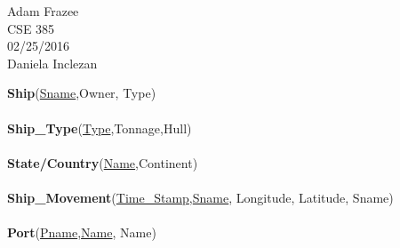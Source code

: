\documentclass[a4paper,12pt]{article}
\begin{document}
\begin{flushleft}
Adam Frazee\\
CSE 385\\
02/25/2016\\
Daniela Inclezan\\
\end{flushleft}
\noindent
\textbf{Ship}(\underline{Sname},Owner, Type)\\
\\
\textbf{Ship\_Type}(\underline{Type},Tonnage,Hull)\\
\\
\textbf{State/Country}(\underline{Name},Continent)\\
\\
\textbf{Ship\_Movement}(\underline{Time\_Stamp},\underline{Sname}, Longitude, Latitude, Sname)\\
\\
\textbf{Port}(\underline{Pname},\underline{Name}, Name)\\
\\
\end{document}

